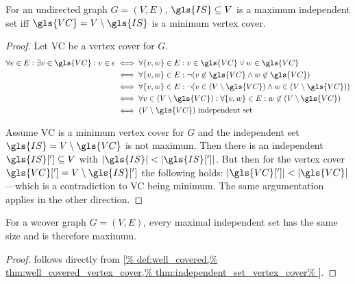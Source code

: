 
\begin{theorem}
  \label{thm:independent_set_vertex_cover}
  For an undirected graph \(G=(V,E)\), \(\gls{IS} \subseteq V\)
  is a maximum independent set iff
  \(\gls{VC} = V \setminus \gls{IS}\) is a minimum vertex
  cover.
\end{theorem}

\begin{proof}
  Let \gls{VC} be a vertex cover for \(G\). 
  \begin{alignat*}{1}
    \forall e \in E : \exists v \in \gls{VC} : v \in e
    &\iff \forall \{v,w\} \in E :
      v \in \gls{VC} \lor w \in \gls{VC} \\
    &\iff \forall \{v, w\} \in E :
      \lnot(v \not\in \gls{VC} \land w \not\in \gls{VC}) \\
    &\iff \forall \{v, w\} \in E :
      \lnot(v \in (V \setminus \gls{VC})
        \land w \in (V \setminus \gls{VC})) \\
    &\iff \forall v \in (V \setminus \gls{VC}) :
      \forall \{v, w\} \in E :
      w \not\in (V \setminus \gls{VC}) \\
    &\iff (V \setminus \gls{VC}) \text{ independent set}
  \end{alignat*}
  
  Assume \gls{VC} is a minimum vertex cover for \(G\) and the
  independent set \(\gls{IS} = V \setminus \gls{VC}\) is not maximum.
  Then there is an independent \(\gls{IS}['] \subseteq V\) with
  \(|\gls{IS}| < |\gls{IS}[']|\). But then for the vertex cover
  \(\gls{VC}['] = V \setminus \gls{IS}[']\) the following holds:
  \(|\gls{VC}[']| < |\gls{VC}|\)---which is a contradiction to
  \gls{VC} being minimum. The same argumentation applies in the other
  direction.
\end{proof}


\begin{theorem}
  \label{thm:well_covered_independent_set}
  For a \gls{wcover} graph \(G=(V,E)\), every maximal independent set
  has the same size and is therefore maximum.
\end{theorem}

\begin{proof}
   follows directly from
  \cref{%
    def:well_covered,%
    thm:well_covered_vertex_cover,%
    thm:independent_set_vertex_cover%
  }.
\end{proof}

